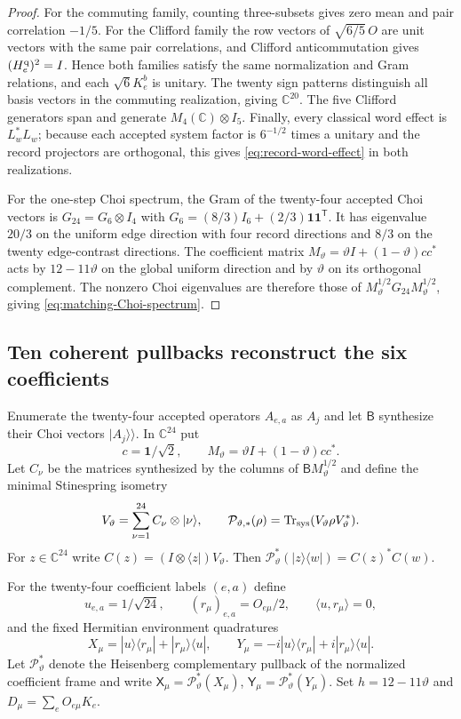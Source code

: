 \documentclass[11pt]{article}
\theoremstyle{definition}
\theoremstyle{remark}
\newcommand{\C}{\mathbb C}
\newcommand{\Tr}{\operatorname{Tr}}
\begin{document}
\begin{proof}
For the commuting family, counting three-subsets gives zero mean and pair
correlation $-1/5$.  For the Clifford family the row vectors of
$\sqrt{6/5}\,O$ are unit vectors with the same pair correlations, and
Clifford anticommutation gives $(H_e^{\rm q})^2=I$.  Hence both families
satisfy the same normalization and Gram relations, and each $\sqrt6K_e^b$
is unitary.  The twenty sign patterns distinguish all basis vectors in the
commuting realization, giving $\C^{20}$.  The five Clifford generators span
and generate $M_4(\C)\otimes I_5$.  Finally, every classical word effect is
$L_w^*L_w$; because each accepted system factor is $6^{-1/2}$ times a
unitary and the record projectors are orthogonal, this gives
\eqref{eq:record-word-effect} in both realizations.

For the one-step Choi spectrum, the Gram of the twenty-four accepted Choi
vectors is $G_{24}=G_6\otimes I_4$ with
$G_6=(8/3)I_6+(2/3)\mathbf1\mathbf1^{\mathsf T}$.  It has eigenvalue
$20/3$ on the uniform edge direction with four record directions and
$8/3$ on the twenty edge-contrast directions.  The coefficient matrix
$M_\vartheta=\vartheta I+(1-\vartheta)cc^*$ acts by
$12-11\vartheta$ on the global uniform direction and by $\vartheta$ on its
orthogonal complement.  The nonzero Choi eigenvalues are therefore those of
$M_\vartheta^{1/2}G_{24}M_\vartheta^{1/2}$, giving
\eqref{eq:matching-Choi-spectrum}.
\end{proof}

\subsection{Ten coherent pullbacks reconstruct the six coefficients}

Enumerate the twenty-four accepted operators $A_{e,a}$ as $A_j$ and let
$\mathsf B$ synthesize their Choi vectors $|A_j\rangle\!\rangle$.  In
$\C^{24}$ put
\[
 c=\mathbf1/\sqrt2,
 \qquad
 M_\vartheta=\vartheta I+(1-\vartheta)cc^*.
\]
Let $C_\nu$ be the matrices synthesized by the columns of
$\mathsf B M_\vartheta^{1/2}$ and define the minimal Stinespring isometry
\[
 V_\vartheta=\sum_{\nu=1}^{24}C_\nu\otimes|\nu\rangle,
 \qquad
 \mathcal P_{\vartheta,*}(\rho)
 =\Tr_{\rm sys}(V_\vartheta\rho V_\vartheta^*).
\]
For $z\in\C^{24}$ write
$C(z)=(I\otimes\langle z|)V_\vartheta$.  Then
$\mathcal P_\vartheta^*(|z\rangle\langle w|)=C(z)^*C(w)$.

For the twenty-four coefficient labels $(e,a)$ define
\[
 u_{e,a}=1/\sqrt{24},
 \qquad (r_\mu)_{e,a}=O_{e\mu}/2,
 \qquad \langle u,r_\mu\rangle=0,
\]
and the fixed Hermitian environment quadratures
\begin{equation}
 X_\mu=|u\rangle\langle r_\mu|+|r_\mu\rangle\langle u|,
 \qquad
 Y_\mu=-i|u\rangle\langle r_\mu|+i|r_\mu\rangle\langle u|.
 \label{eq:ten-quadratures}
\end{equation}
Let $\mathcal P_\vartheta^*$ denote the Heisenberg complementary pullback of
the normalized coefficient frame and write
$\mathsf X_\mu=\mathcal P_\vartheta^*(X_\mu)$,
$\mathsf Y_\mu=\mathcal P_\vartheta^*(Y_\mu)$.  Set
$h=12-11\vartheta$ and $D_\mu=\sum_eO_{e\mu}K_e$.
\end{document}
